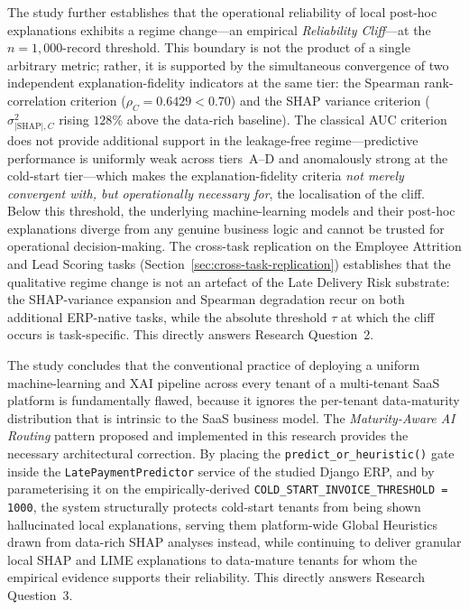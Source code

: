 The study further establishes that the operational reliability of local
post-hoc explanations exhibits a regime change---an empirical
\emph{Reliability Cliff}---at the $n = 1{,}000$-record threshold. This
boundary is not the product of a single arbitrary metric; rather, it is
supported by the simultaneous convergence of two independent
explanation-fidelity indicators at the same tier: the Spearman
rank-correlation criterion ($\rho_C = 0.6429 < 0.70$) and the SHAP
variance criterion ($\sigma^2_{|\mathrm{SHAP}|,C}$ rising $128\%$ above
the data-rich baseline). The classical AUC criterion does not provide
additional support in the leakage-free regime---predictive performance is
uniformly weak across tiers~A--D and anomalously strong at the cold-start
tier---which makes the explanation-fidelity criteria \emph{not merely
convergent with, but operationally necessary for}, the localisation of the
cliff. Below this threshold, the underlying machine-learning models and
their post-hoc explanations diverge from any genuine business logic and
cannot be trusted for operational decision-making. The cross-task
replication on the Employee Attrition and Lead Scoring tasks
(Section~\ref{sec:cross-task-replication}) establishes that the
qualitative regime change is not an artefact of the Late Delivery Risk substrate:
the SHAP-variance expansion and Spearman degradation recur on both
additional ERP-native tasks, while the absolute threshold $\tau$ at
which the cliff occurs is task-specific. This directly answers
Research Question~2.

The study concludes that the conventional practice of deploying a uniform
machine-learning and XAI pipeline across every tenant of a multi-tenant
SaaS platform is fundamentally flawed, because it ignores the per-tenant
data-maturity distribution that is intrinsic to the SaaS business model.
The \emph{Maturity-Aware AI Routing} pattern proposed and implemented in
this research provides the necessary architectural correction. By placing
the \texttt{predict\_or\_heuristic()} gate inside the
\texttt{LatePaymentPredictor} service of the studied Django ERP, and by
parameterising it on the empirically-derived
\texttt{COLD\_START\_INVOICE\_THRESHOLD = 1000}, the system structurally
protects cold-start tenants from being shown hallucinated local
explanations, serving them platform-wide Global Heuristics drawn from
data-rich SHAP analyses instead, while continuing to deliver granular
local SHAP and LIME explanations to data-mature tenants for whom the
empirical evidence supports their reliability. This directly answers
Research Question~3.

